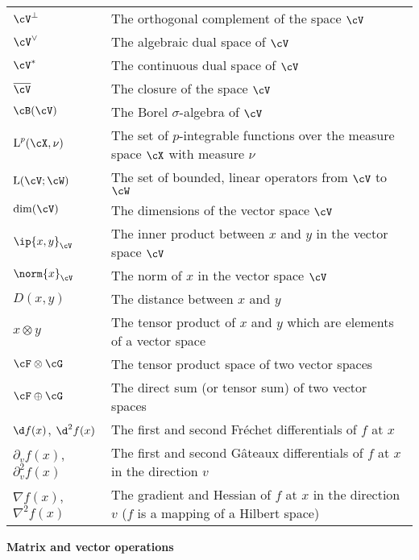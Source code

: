 \begin{longtable}{p{}p{}}
  $\cV^\bot$ & The orthogonal complement of the space $\cV$  \\  
  $\cV^\vee$ & The algebraic dual space of $\cV$ \\    
  $\cV^*$ & The continuous dual space of $\cV$ \\  
  $\overline\cV$ & The closure of the space $\cV$ \\    
  $\cB(\cV)$ & The Borel $\sigma$-algebra of $\cV$ \\    
  $\text{L}^p(\cX,\nu)$ & The set of $p$-integrable functions over the measure space $\cX$ with measure $\nu$ \\   
  $\text{L}(\cV;\cW)$ & The set of bounded, linear operators from $\cV$ to $\cW$ \\      
  $\dim(\cV)$ & The dimensions of the vector space $\cV$ \\         
  $\ip{x,y}_\cV$ & The inner product between $x$ and $y$ in the vector space $\cV$\\   
  $\norm{x}_\cV$ & The norm of $x$ in the vector space $\cV$ \\    
  $D(x,y)$ & The distance between $x$ and $y$ \\  
  $x \otimes y$ & The tensor product of $x$ and $y$ which are elements of a vector space \\
  $\cF \otimes \cG$ & The tensor product space of two vector spaces \\
  $\cF \oplus \cG$ & The direct sum (or tensor sum) of two vector spaces \\
  $\d f(x)$, $\d^2 f(x)$  & The first and second Fréchet differentials of $f$ at $x$ \\
  $\partial_v f(x)$, $\partial_v^2 f(x)$  & The first and second Gâteaux differentials of $f$ at $x$ in the direction $v$ \\  
  $\nabla f(x)$, $\nabla^2 f(x)$  & The gradient and Hessian of $f$ at $x$ in the direction $v$ ($f$ is a mapping of a Hilbert space)  \\    
\end{longtable}

\noindent\textbf{Matrix and vector operations}

